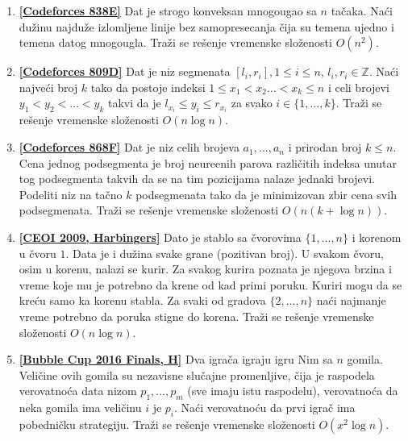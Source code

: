 \documentclass[a4paper,12pt]{article}
\numberwithin{equation}{subsection}
\begin{document}
\begin{enumerate}
\item \textbf{\href{http://codeforces.com/problemset/problem/838/E}{[Codeforces 838E]}} Dat je strogo konveksan mnogougao sa $n$ ta\v caka. Na\' ci du\v zinu najdu\v ze izlomljene linije bez samopresecanja \v cija su temena ujedno i temena datog mnogougla. Tra\v zi se re\v senje vremenske slo\v zenosti $O(n^2)$.

\item \textbf{\href{http://codeforces.com/problemset/problem/809/D}{[Codeforces 809D]}} Dat je niz segmenata $[l_i, r_i], 1 \leq i \leq n$, $l_i, r_i \in \mathbb{Z}$. Na\' ci najve\' ci broj $k$ tako da postoje indeksi $1 \leq x_1 < x_2 \ldots < x_k \leq n$ i celi brojevi $y_1 < y_2 < \ldots < y_k$ takvi da je $l_{x_i} \leq y_i \leq r_{x_i}$ za svako $i \in \{1, \ldots, k \}$. Tra\v zi se re\v senje vremenske slo\v zenosti $O(n \log n)$.

\item \textbf{\href{http://codeforces.com/problemset/problem/868/F}{[Codeforces 868F]}} Dat je niz celih brojeva $a_1, \ldots, a_n$ i prirodan broj $k \leq n$. Cena jednog podsegmenta je broj neure\dj enih parova razli\v citih indeksa unutar tog podsegmenta takvih da se na tim pozicijama nalaze jednaki brojevi. Podeliti niz na ta\v cno $k$ podsegmenata tako da je minimizovan zbir cena svih podsegmenata. Tra\v zi se re\v senje vremenske slo\v zenosti $O(n(k + \log n))$.

\item \textbf{\href{http://ceoi.inf.elte.hu/probarch/09/harbingers.pdf}{[CEOI 2009, Harbingers]}} Dato je stablo sa \v cvorovima $\{1, \ldots, n\}$ i korenom u \v cvoru $1$. Data je i du\v zina svake grane (pozitivan broj). U svakom \v cvoru, osim u korenu, nalazi se kurir. Za svakog kurira poznata je njegova brzina i vreme koje mu je potrebno da krene od kad primi poruku. Kuriri mogu da se kre\' cu samo ka korenu stabla. Za svaki od gradova $\{2, \ldots, n\}$ na\' ci najmanje vreme potrebno da poruka stigne do korena. Tra\v zi se re\v senje vremenske slo\v zenosti $O(n \log n)$.

\item \textbf{\href{http://bubblecup.petlja.org/Content/Media/Booklet2016.pdf}{[Bubble Cup 2016 Finals, H]}} Dva igra\v ca igraju igru Nim sa $n$ gomila. Veli\v cine ovih gomila su nezavisne slu\v cajne promenljive, \v cija je raspodela verovatno\' ca data nizom $p_1, \ldots, p_m$ (sve imaju istu raspodelu), verovatno\' ca da neka gomila ima veli\v cinu $i$ je $p_i$. Na\' ci verovatno\' cu da prvi igra\v c ima pobedni\v cku strategiju. Tra\v zi se re\v senje vremenske slo\v zenosti $O(x^2 \log n)$.

\end{enumerate}
\end{document}

